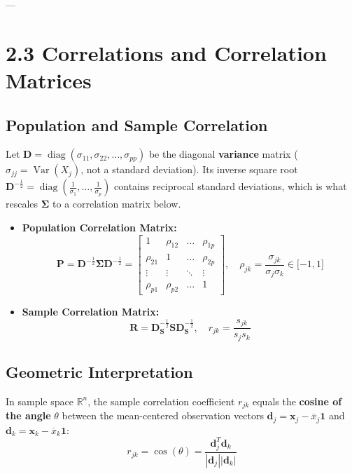 \documentclass[
]{article}
\begin{document}
---

\textbf{ }

\section{2.3 Correlations and Correlation Matrices}

\textbf{ }

\subsection{Population and Sample Correlation}

Let
\(\mathbf{D} = \operatorname{diag}(\sigma_{11},\sigma_{22},\ldots,\sigma_{pp})\)
be the diagonal \textbf{variance} matrix
(\(\sigma_{jj} = \operatorname{Var}(X_{j})\), not a standard deviation).
Its inverse square root
\(\mathbf{D}^{- \frac{1}{2}} = \operatorname{diag}(\frac{1}{\sigma_{1}},\ldots,\frac{1}{\sigma_{p}})\)
contains reciprocal standard deviations, which is what rescales
\(\mathbf{\Sigma}\) to a correlation matrix below.

\begin{itemize}
\item
  \textbf{Population Correlation Matrix:}
  \[\mathbf{P} = \mathbf{D}^{- \frac{1}{2}}\mathbf{\Sigma}\mathbf{D}^{- \frac{1}{2}} = \begin{bmatrix}
  1 & \rho_{12} & \ldots & \rho_{1p} \\
  \rho_{21} & 1 & \ldots & \rho_{2p} \\
   \vdots & \vdots & \ddots & \vdots \\
  \rho_{p1} & \rho_{p2} & \ldots & 1
  \end{bmatrix},\quad\rho_{jk} = \frac{\sigma_{jk}}{\sigma_{j}\sigma_{k}} \in \lbrack - 1,1\rbrack\]
\item
  \textbf{Sample Correlation Matrix:}
  \[\mathbf{R} = \mathbf{D}_{\mathbf{S}}^{- \frac{1}{2}}\mathbf{S}\mathbf{D}_{\mathbf{S}}^{- \frac{1}{2}},\quad r_{jk} = \frac{s_{jk}}{s_{j}s_{k}}\]
\end{itemize}

\textbf{ }

\subsection{Geometric Interpretation}

In sample space \(\mathbb{R}^{n}\), the sample correlation coefficient
\(r_{jk}\) equals the \textbf{cosine of the angle} \(\theta\) between
the mean-centered observation vectors
\(\mathbf{d}_{j} = \mathbf{x}_{j} - {\overline{x}}_{j}\mathbf{1}\) and
\(\mathbf{d}_{k} = \mathbf{x}_{k} - {\overline{x}}_{k}\mathbf{1}\):
\[r_{jk} = \cos(\theta) = \frac{\mathbf{d}_{j}^{T}\mathbf{d}_{k}}{|\mathbf{d}_{j}||\mathbf{d}_{k}|}\]
\end{document}
